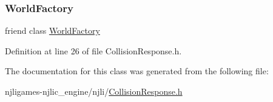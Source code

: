 \subsubsection{\texorpdfstring{World\+Factory}{WorldFactory}}
{\footnotesize\ttfamily friend class \mbox{\hyperlink{classnjli_1_1_world_factory}{World\+Factory}}\hspace{0.3cm}{\ttfamily [friend]}}



Definition at line 26 of file Collision\+Response.\+h.



The documentation for this class was generated from the following file\+:\begin{DoxyCompactItemize}
\item 
njligames-\/njlic\+\_\+engine/njli/\mbox{\hyperlink{_collision_response_8h}{Collision\+Response.\+h}}\end{DoxyCompactItemize}
